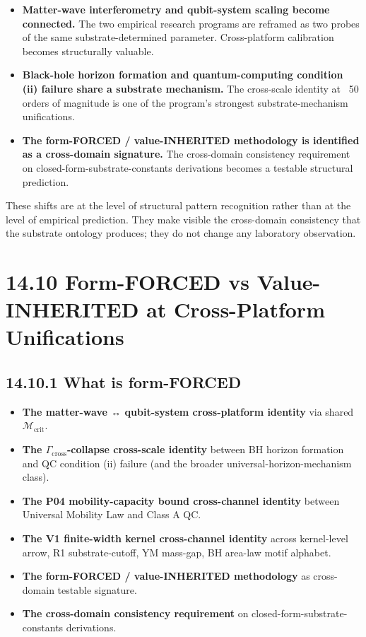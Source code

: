 \documentclass[11pt]{book}
\begin{document}
\begin{itemize}
\item \textbf{Matter-wave interferometry and qubit-system scaling become connected.} The two empirical research programs are reframed as two probes of the same substrate-determined parameter. Cross-platform calibration becomes structurally valuable.
\item \textbf{Black-hole horizon formation and quantum-computing condition (ii) failure share a substrate mechanism.} The cross-scale identity at ~50 orders of magnitude is one of the program's strongest substrate-mechanism unifications.
\item \textbf{The form-FORCED / value-INHERITED methodology is identified as a cross-domain signature.} The cross-domain consistency requirement on closed-form-substrate-constants derivations becomes a testable structural prediction.
\end{itemize}

These shifts are at the level of structural pattern recognition rather than at the level of empirical prediction. They make visible the cross-domain consistency that the substrate ontology produces; they do not change any laboratory observation.

\section{14.10 Form-FORCED vs Value-INHERITED at Cross-Platform Unifications}

\subsection{14.10.1 What is form-FORCED}

\begin{itemize}
\item \textbf{The matter-wave ↔ qubit-system cross-platform identity} via shared $\mathcal{M}_\mathrm{crit}$.
\item \textbf{The $\Gamma_\mathrm{cross}$-collapse cross-scale identity} between BH horizon formation and QC condition (ii) failure (and the broader universal-horizon-mechanism class).
\item \textbf{The P04 mobility-capacity bound cross-channel identity} between Universal Mobility Law and Class A QC.
\item \textbf{The V1 finite-width kernel cross-channel identity} across kernel-level arrow, R1 substrate-cutoff, YM mass-gap, BH area-law motif alphabet.
\item \textbf{The form-FORCED / value-INHERITED methodology} as cross-domain testable signature.
\item \textbf{The cross-domain consistency requirement} on closed-form-substrate-constants derivations.
\end{itemize}
\end{document}
